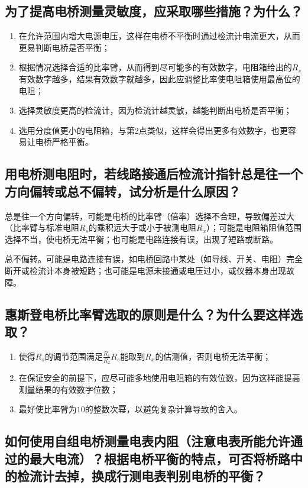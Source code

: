 \documentclass[]{../../templates/Report}%
\begin{document}
\begin{fullreportonly}
    \subsection{为了提高电桥测量灵敏度，应采取哪些措施？为什么？}
    \begin{enumerate}
        \item 在允许范围内增大电源电压，这样在电桥不平衡时通过检流计电流更大，从而更易判断电桥是否平衡；
        \item 根据情况选择合适的比率臂，从而得到尽可能多的有效数字，电阻箱给出的$R_s$有效数字越多，结果有效数字就越多，因此应调整比率使电阻箱使用最高位的电阻；
        \item 选择灵敏度更高的检流计，因为检流计越灵敏，越能判断出电桥是否平衡；
        \item 选用分度值更小的电阻箱，与第2点类似，这样会得出更多有效数字，也更容易让电桥严格平衡。
    \end{enumerate}
    \subsection{用电桥测电阻时，若线路接通后检流计指针总是往一个方向偏转或总不偏转，试分析是什么原因？}
    总是往一个方向偏转，可能是电桥的比率臂（倍率）选择不合理，导致偏差过大（比率臂与标准电阻$R_s$的乘积远大于或小于被测电阻$R_x$）；可能是电阻箱阻值范围选择不当，使电桥无法平衡；也可能是电路连接有误，出现了短路或断路。

    总不偏转。可能是电路连接有误，如电桥回路中某处（如导线、开关、电阻）完全断开或检流计本身被短路；也可能是电源未接通或电压过小，或仪器本身出现故障。
    \subsection{惠斯登电桥比率臂选取的原则是什么？为什么要这样选取？}
    \begin{enumerate}
        \item 使得$R_s$的调节范围满足$\frac{R_1}{R_2}R_s$能取到$R_x$的估测值，否则电桥无法平衡；
        \item 在保证安全的前提下，应尽可能多地使用电阻箱的有效位数，因为这样能提高测量结果的有效数字位数；
        \item 最好使比率臂为$10$的整数次幂，以避免复杂计算导致的舍入。
    \end{enumerate}


    \subsection{如何使用自组电桥测量电表内阻（注意电表所能允许通过的最大电流）？根据电桥平衡的特点，可否将桥路中的检流计去掉，换成行测电表判别电桥的平衡？}


\end{fullreportonly}
\end{document}
